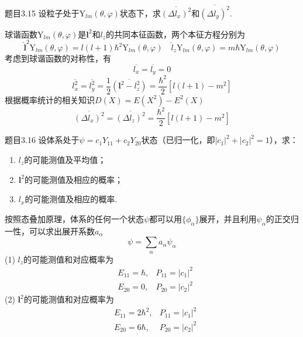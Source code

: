 \begin{question}{题目3.15}
    设粒子处于$\mathrm{Y}_{lm}(\theta,\varphi)$状态下，求$\overline{(\Delta l_x)^2}$和$\overline{(\Delta l_y)^2}$.
\end{question}
\begin{solution}
    球谐函数$\mathrm{Y}_{lm}(\theta, \varphi)$是$\boldsymbol{l}^2$和$l_z$的共同本征函数，两个本征方程分别为
    $$
        \hat{\boldsymbol{l}}^2\mathrm{Y}_{lm}(\theta, \varphi)=l(l+1)\hbar^2\mathrm{Y}_{lm}(\theta,\varphi)
        \quad
        \hat{l}_z\mathrm{Y}_{lm}(\theta, \varphi)=m\hbar\mathrm{Y}_{lm}(\theta,\varphi)
    $$
    考虑到球谐函数的对称性，有
    $$
        \overline{l_x} = \overline{l_y} = 0
    $$
    $$
        \overline{l_x^2} = \overline{l_y^2} = \frac{1}{2}\overline{\left(\boldsymbol{l}^2-l_z^2\right)} = \frac{\hbar^2}{2}\left[l(l+1)-m^2\right]
    $$
    根据概率统计的相关知识$D(X)=E(X^2)-E^2(X)$
    $$
        \overline{(\Delta l_x)^2} = \overline{(\Delta l_z)^2} = \frac{\hbar^2}{2}\left[l(l+1)-m^2\right]
    $$
\end{solution}




\begin{question}{题目3.16}
    设体系处于$\psi=c_1Y_{11}+c_2Y_{20}$状态（已归一化，即$|c_1|^2+|c_2|^2=1$），求：
    \begin{enumerate}
        \item $l_z$的可能测值及平均值；
        \item $\boldsymbol{l}^2$的可能测值及相应的概率；
        \item $l_x$的可能测值及相应的概率.
    \end{enumerate}
\end{question}
\begin{solution}
    按照态叠加原理，体系的任何一个状态$\psi$都可以用$\{\phi_{\alpha}\}$展开，并且利用$\psi_{\alpha}$的正交归一性，可以求出展开系数$a_{\alpha}$
    $$
        \psi = \sum_{\alpha} a_{\alpha}\psi_{\alpha}
    $$
    (1) $l_z$的可能测值和对应概率为
    $$
        \begin{aligned}
             & E_{11} = \hbar, & P_{11} = |c_1|^2 \\
             & E_{20} = 0,     & P_{20} = |c_2|^2
        \end{aligned}
    $$
    (2) $\boldsymbol{l}^2$的可能测值和对应概率为
    $$
        \begin{aligned}
             & E_{11} = 2\hbar^2, & P_{11} = |c_1|^2 \\
             & E_{20} = 6\hbar,   & P_{20} = |c_2|^2
        \end{aligned}
    $$
\end{solution}





